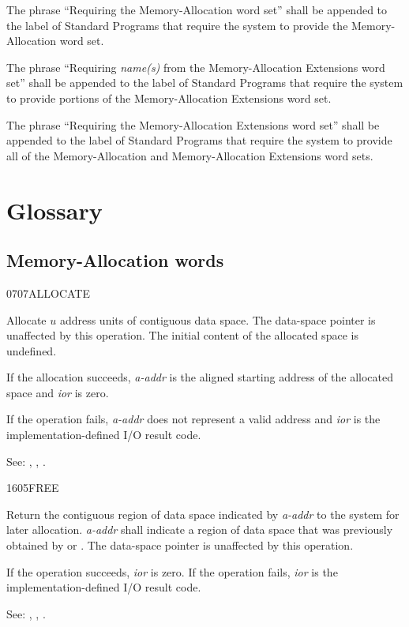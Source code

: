 The phrase ``Requiring the Memory-Allocation word set'' shall be
appended to the label of Standard Programs that require the system
to provide the Memory-Allocation word set.

The phrase ``Requiring \emph{name(s)} from the Memory-Allocation
Extensions word set'' shall be appended to the label of Standard
Programs that require the system to provide portions of the
Memory-Allocation Extensions word set.

The phrase ``Requiring the Memory-Allocation Extensions word set''
shall be appended to the label of Standard Programs that require
the system to provide all of the Memory-Allocation and
Memory-Allocation Extensions word sets.


\section{Glossary} %

\subsection{Memory-Allocation words} %


\begin{newword}{0707}{ALLOCATE}

	Allocate $u$ address units of contiguous data space. The
	data-space pointer is unaffected by this operation. The initial
	content of the allocated space is undefined.

	If the allocation succeeds, \emph{a-addr} is the aligned
	starting address of the allocated space and \emph{ior} is
	zero.

	If the operation fails, \emph{a-addr} does not represent a valid
	address and \emph{ior} is the implementation-defined I/O result
	code.

\item[See:]
	,
	,
	.
\end{newword}


\begin{newword}{1605}{FREE}

	Return the contiguous region of data space indicated by
	\emph{a-addr} to the system for later allocation. \emph{a-addr}
	shall indicate a region of data space that was previously
	obtained by  or . The data-space
	pointer is unaffected by this operation.

	If the operation succeeds, \emph{ior} is zero. If the operation
	fails, \emph{ior} is the implementation-defined I/O result code.

\item[See:]
	,
	,
	.
\end{newword}



